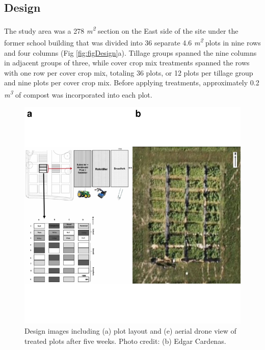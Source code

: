 \documentclass[
  12pt,
]{article}
\begin{document}
\hypertarget{design}{%
\subsection{Design}\label{design}}

The study area was a 278 \emph{m\textsuperscript{2}}
section on the East side of the site under the former school building that was divided into 36 separate 4.6 \emph{m\textsuperscript{2}}
plots in nine rows and four columns (Fig \ref{fig:figDesign}a).
Tillage groups spanned the nine columns in adjacent groups of three, while cover crop mix treatments spanned the rows with one row per cover crop mix, totaling 36 plots, or 12 plots per tillage group and nine plots per cover crop mix.
Before applying treatments, approximately 0.2 \emph{m\textsuperscript{3}}
of compost was incorporated into each plot.

\begin{figure}
\centering
\includegraphics{merge_files/figure-latex/designFig-1.pdf}
\caption{\label{fig:designFig}Design images including (a) plot layout and (e) aerial drone view of treated plots after five weeks. Photo credit: (b) Edgar Cardenas.}
\end{figure}
\end{document}
